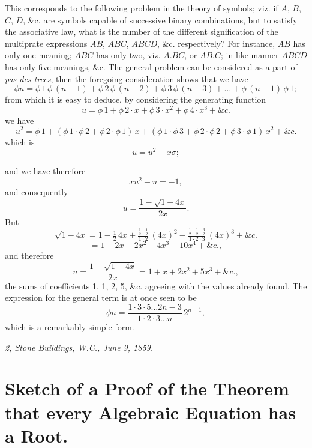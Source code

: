 \documentclass[11pt,a4paper]{article}
\begin{document}
\noindent
This corresponds to the following problem in the theory of symbols; viz. if $A$, $B$, $C$, $D$, \&c. are symbols capable of successive binary combinations, but to satisfy the associative law, what is the number of the different signification of the multiprate expressions $AB$, $ABC$, $ABCD$, \&c. respectively? For instance, $AB$ has only one meaning; $ABC$ has only two, viz. $A.BC$, or $AB.C$; in like manner $ABCD$ has only five meanings, &c. The general problem can be considered as a part of \textit{pas des trees}, then the foregoing consideration shows that we have
\[
\phi n = \phi\,1\,\phi\,(n-1) + \phi\,2\,\phi\,(n-2) + \phi\,3\,\phi\,(n-3) + \ldots + \phi\,(n-1)\,\phi\,1;
\]
from which it is easy to deduce, by considering the generating function
\[
u = \phi\,1 + \phi\,2 \cdot x + \phi\,3 \cdot x^2 + \phi\,4 \cdot x^3 + \&c.
\]
we have
\[
u^2 = \phi\,1 + (\phi\,1\cdot\phi\,2 + \phi\,2\cdot\phi\,1)\,x + (\phi\,1\cdot\phi\,3 + \phi\,2\cdot\phi\,2 + \phi\,3\cdot\phi\,1)\,x^2 + \&c.
\]
which is
\[
u = u^2 - x\sigma;
\]

\setcounter{page}{115}

and we have therefore
\[
xu^2 - u = -1,
\]
and consequently
\[
u = \frac{1-\sqrt{1-4x}}{2x}.
\]
But
\[
\sqrt{1-4x} = 1 - \tfrac{1}{2}\,4x + \tfrac{\frac{1}{2}\cdot \frac{1}{2}}{1\cdot 2}\,(4x)^2 - \tfrac{\frac{1}{2}\cdot \frac{1}{2}\cdot \frac{3}{2}}{1\cdot 2\cdot 3}\,(4x)^3 + \&c.
\]
\[
= 1 - 2x - 2x^2 - 4x^3 - 10x^4 + \&c.,
\]
and therefore
\[
u = \frac{1 - \sqrt{1-4x}}{2x} = 1 + x + 2x^2 + 5x^3 + \&c.,
\]
the sums of coefficients 1, 1, 2, 5, \&c. agreeing with the values already found. The expression for the general term is at once seen to be
\[
\phi n = \frac{1\cdot 3\cdot 5 \ldots 2n-3}{1\cdot 2\cdot 3 \ldots n}\,2^{n-1},
\]
which is a remarkably simple form.

\smallskip
\noindent\textit{2, Stone Buildings, W.C., June 9, 1859.}

\newpage


\setcounter{page}{116}

\section*{Sketch of a Proof of the Theorem that every Algebraic Equation has a Root.}
\label{paper:248}
\end{document}
